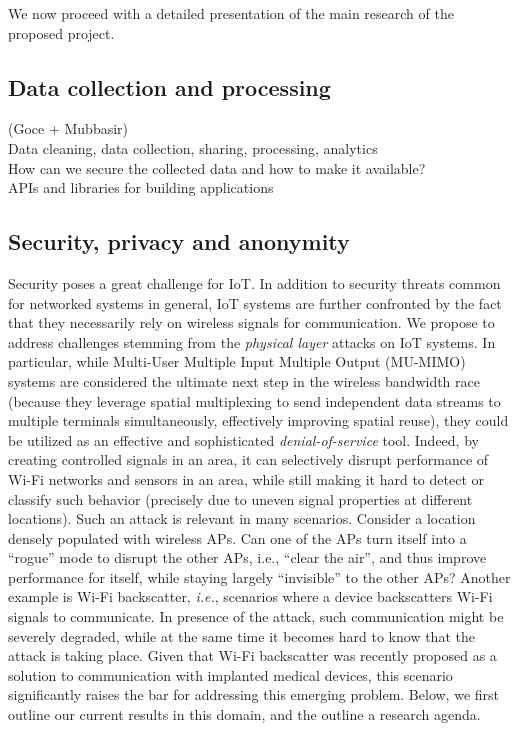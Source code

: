 We now proceed with a detailed presentation of the main research of the proposed project. 


\subsection{Data collection and processing} 
(Goce + Mubbasir)\\
Data cleaning, data collection, sharing, processing, analytics\\
How can we secure the collected data and how to make it available?\\
APIs and libraries for building applications 


 



\subsection{Security, privacy and anonymity}



Security poses a great challenge for IoT. In addition to security threats common for networked systems in general, IoT systems are further confronted by the fact that they necessarily rely on wireless signals for communication. We propose to address challenges stemming from the \emph{physical layer} attacks on IoT systems. In particular, while Multi-User Multiple Input Multiple Output (MU-MIMO) systems are considered the ultimate next step in the wireless bandwidth race (because they leverage spatial multiplexing to send independent data streams to multiple terminals simultaneously, effectively improving spatial reuse), they could be utilized as an effective and sophisticated \emph{denial-of-service} tool. Indeed, by creating controlled signals in an area, it can selectively disrupt performance of Wi-Fi networks and sensors in an area, while still making it hard to detect or classify such behavior (precisely due to uneven signal properties at different locations). Such an attack is relevant in many scenarios. Consider a location densely populated with wireless APs. Can one of the APs turn itself into a “rogue” mode to disrupt the other APs, i.e., “clear the air”, and thus improve performance for itself, while staying largely “invisible” to the other APs? Another example is Wi-Fi backscatter, \emph{i.e.}, scenarios where a device backscatters Wi-Fi signals to communicate. In presence of the attack, such communication might be severely degraded, while at the same time it becomes hard to know that the attack is taking place. Given that Wi-Fi backscatter was recently proposed as a solution to communication with implanted medical devices, this scenario significantly raises the bar for addressing this emerging problem. Below, we first outline our current results in this domain, and the outline a research agenda. 


